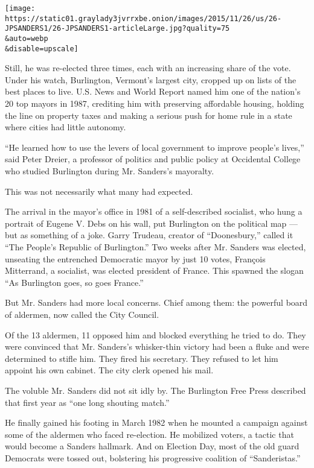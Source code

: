 \texttt{[image: https://static01.graylady3jvrrxbe.onion/images/2015/11/26/us/26-JPSANDERS1/26-JPSANDERS1-articleLarge.jpg?quality=75\\\&auto=webp\\\&disable=upscale]}

Still, he was re-elected three times, each with an increasing share of
the vote. Under his watch, Burlington, Vermont's largest city, cropped
up on lists of the best places to live. U.S. News and World Report named
him one of the nation's 20 top mayors in 1987, crediting him with
preserving affordable housing, holding the line on property taxes and
making a serious push for home rule in a state where cities had little
autonomy.

``He learned how to use the levers of local government to improve
people's lives,'' said Peter Dreier, a professor of politics and public
policy at Occidental College who studied Burlington during Mr. Sanders's
mayoralty.

This was not necessarily what many had expected.

The arrival in the mayor's office in 1981 of a self-described socialist,
who hung a portrait of Eugene V. Debs on his wall, put Burlington on the
political map --- but as something of a joke. Garry Trudeau, creator of
``Doonesbury,'' called it ``The People's Republic of Burlington.'' Two
weeks after Mr. Sanders was elected, unseating the entrenched Democratic
mayor by just 10 votes, François Mitterrand, a socialist, was elected
president of France. This spawned the slogan ``As Burlington goes, so
goes France.''

But Mr. Sanders had more local concerns. Chief among them: the powerful
board of aldermen, now called the City Council.

Of the 13 aldermen, 11 opposed him and blocked everything he tried to
do. They were convinced that Mr. Sanders's whisker-thin victory had been
a fluke and were determined to stifle him. They fired his secretary.
They refused to let him appoint his own cabinet. The city clerk opened
his mail.

The voluble Mr. Sanders did not sit idly by. The Burlington Free Press
described that first year as ``one long shouting match.''

He finally gained his footing in March 1982 when he mounted a campaign
against some of the aldermen who faced re-election. He mobilized voters,
a tactic that would become a Sanders hallmark. And on Election Day, most
of the old guard Democrats were tossed out, bolstering his progressive
coalition of ``Sanderistas.''


